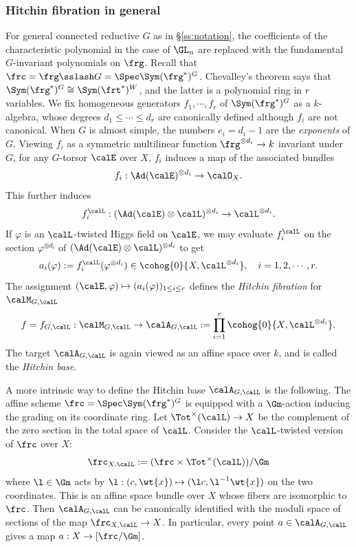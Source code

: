 \subsubsection{Hitchin fibration in general}\label{sss:Hit fib general} For general connected reductive $G$ as in \S\ref{ss:notation}, the coefficients of the characteristic polynomial in the case of $\GL_{n}$ are replaced with the fundamental $G$-invariant polynomials on $\frg$. Recall that $\frc=\frg\sslash G=\Spec\Sym(\frg^{*})^{G}$. Chevalley's theorem says that $\Sym(\frg^{*})^{G}\cong\Sym(\frt^{*})^{W}$, and the latter is a polynomial ring in $r$ variables. We fix homogeneous generators $f_{1},\cdots, f_{r}$ of $\Sym(\frg^{*})^{G}$ as a $k$-algebra, whose degrees  $d_{1}\leq \cdots \leq d_{r}$ are canonically defined although $f_{i}$ are not canonical.  When $G$ is almost simple, the numbers $e_{i}=d_{i}-1$ are the {\em exponents} of $G$. Viewing $f_{i}$ as a symmetric multilinear function $\frg^{\otimes d_{i}}\to k$ invariant under $G$, for any $G$-torsor $\calE$ over $X$, $f_{i}$ induces a map of the associated bundles
\begin{equation*}
f_{i}: \Ad(\calE)^{\otimes d_{i}}\to\calO_{X}.
\end{equation*}
This further induces
\begin{equation*}
f^{\calL}_{i}:(\Ad(\calE)\otimes\calL)^{\otimes d_{i}}\to\calL^{\otimes d_{i}}.
\end{equation*}
If $\varphi$ is an $\calL$-twisted Higgs field on $\calE$,  we may evaluate $f^{\calL}_{i}$ on the section $\varphi^{\otimes d_{i}}$ of $(\Ad(\calE)\otimes\calL)^{\otimes d_{i}}$ to get
\begin{equation*}
a_{i}(\varphi):=f^{\calL}_{i}(\varphi^{\otimes d_{i}})\in\cohog{0}{X,\calL^{\otimes d_{i}}},  \quad i=1,2,\cdots, r.
\end{equation*}
The assignment $(\calE,\varphi)\mapsto(a_{i}(\varphi))_{1\leq i\leq r}$ defines the {\em Hitchin fibration} for $\calM_{G,\calL}$
\begin{equation*}
f=f_{G,\calL}: \calM_{G,\calL}\to \calA_{G,\calL}:=\prod_{i=1}^{r}\cohog{0}{X,\calL^{\otimes d_{i}}}.
\end{equation*}
The target $\calA_{G,\calL}$ is again viewed as an affine space over $k$, and is called the {\em  Hitchin base}.

A more intrinsic way to define the Hitchin base $\calA_{G,\calL}$ is the following. The affine scheme $\frc=\Spec \Sym(\frg^{*})^{G}$ is  equipped with a $\Gm$-action inducing the grading on its coordinate ring. Let $\Tot^{\times}(\calL)\to X$ be the complement of the zero section in the total space of $\calL$. Consider the $\calL$-twisted version of $\frc$ over $X$:
\begin{equation*}
\frc_{X,\calL}:=(\frc\times \Tot^{\times}(\calL))/\Gm
\end{equation*}
where $\l\in\Gm$ acts by $\l: (c,\wt{x})\mapsto (\l c, \l^{-1}\wt{x})$ on the two coordinates. This is an affine space bundle over $X$ whose fibers are isomorphic to $\frc$. Then $\calA_{G,\calL}$ can be canonically identified with the moduli space of sections of the map $\frc_{X,\calL}\to X$. In particular, every point $a\in\calA_{G,\calL}$ gives a map $a:X\to [\frc/\Gm]$.



